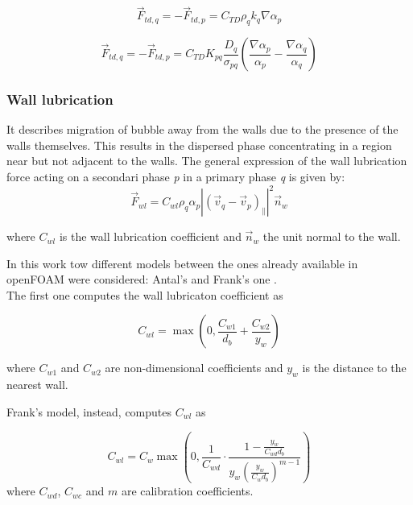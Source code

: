 \documentclass[11pt,a4paper]{article}
\begin{document}
\begin{equation}
\vec{F}_{t d, q}=-\vec{F}_{t d, p}=C_{T D} \rho_{q} k_{q} \nabla \alpha_{p}
\label{eq:lopez}
\end{equation}




\begin{equation}
\vec{F}_{t d, q}=-\vec{F}_{t d, p}=C_{T D} K_{p q} \frac{D_{q}}{\sigma_{p q}}\left(\frac{\nabla \alpha_{p}}{\alpha_{p}}-\frac{\nabla \alpha_{q}}{\alpha_{q}}\right)
\label{eq:burns}
\end{equation}



\subsubsection{Wall lubrication}
It describes migration of bubble away from the walls due to the presence of the walls themselves. This results in the dispersed phase concentrating in a region near but not adjacent to the walls. The general expression of the wall lubrication force acting on a secondari phase \textit{p} in a primary phase \textit{q} is given by:
\begin{equation}
\vec{F}_{w l}=C_{w l} \rho_{q} \alpha_{p}\left|\left(\vec{v}_{q}-\vec{v}_{p}\right)_{\|}\right|^{2} \vec{n}_{w}
\end{equation}

where $C_{w l}$ is the wall lubrication coefficient and $\vec{n}_{w}$ the unit normal to the wall.

In this work tow different models between the ones already available in openFOAM were considered: Antal's \cite{antal} and Frank's one \cite{frank}.\\

The first one computes the wall lubricaton coefficient as

\begin{equation}
C_{w l}=\max \left(0, \frac{C_{w 1}}{d_{b}}+\frac{C_{w 2}}{y_{w}}\right)
\end{equation}

where $C_{w 1}$ and $C_{w 2}$ are non-dimensional coefficients and $y_{w}$ is the distance to the nearest wall.

Frank's model, instead, computes $C_{w l}$ as

\begin{equation}
C_{w l}=C_{w} \max \left(0, \frac{1}{C_{w d}} \cdot \frac{1-\frac{y_{w}}{C_{w d} d_{b}}}{y_{w}\left(\frac{y_{w}}{C_{w} d_{b}}\right)^{m-1}}\right)
\end{equation}
where $C_{w d}$, $C_{w c}$ and $m$ are calibration coefficients.
\end{document}
